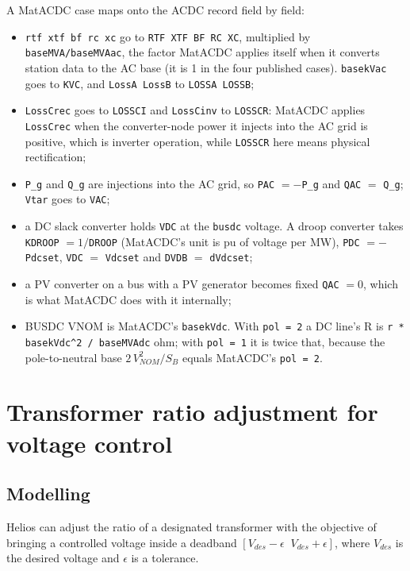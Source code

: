 A MatACDC case maps onto the ACDC record field by field:
\begin{itemize}
\item {\tt rtf xtf bf rc xc} go to {\tt RTF XTF BF RC XC}, multiplied by {\tt baseMVA/baseMVAac}, the factor MatACDC applies itself when it converts station data to the AC base (it is 1 in the four published cases). {\tt basekVac} goes to {\tt KVC}, and {\tt LossA LossB} to {\tt LOSSA LOSSB};
\item {\tt LossCrec} goes to {\tt LOSSCI} and {\tt LossCinv} to {\tt LOSSCR}: MatACDC applies {\tt LossCrec} when the converter-node power it injects into the AC grid is positive, which is inverter operation, while {\tt LOSSCR} here means physical rectification;
\item {\tt P\_g} and {\tt Q\_g} are injections into the AC grid, so {\tt PAC} $= -${\tt P\_g} and {\tt QAC} $=$ {\tt Q\_g}; {\tt Vtar} goes to {\tt VAC};
\item a DC slack converter holds {\tt VDC} at the {\tt busdc} voltage. A droop converter takes {\tt KDROOP} $= 1/${\tt DROOP} (MatACDC's unit is pu of voltage per MW), {\tt PDC} $= -${\tt Pdcset}, {\tt VDC} $=$ {\tt Vdcset} and {\tt DVDB} $=$ {\tt dVdcset};
\item a PV converter on a bus with a PV generator becomes fixed {\tt QAC} $= 0$, which is what MatACDC does with it internally;
\item BUSDC VNOM is MatACDC's {\tt basekVdc}. With {\tt pol = 2} a DC line's R is {\tt r * basekVdc\^{}2 / baseMVAdc} ohm; with {\tt pol = 1} it is twice that, because the pole-to-neutral base $2\,V_{NOM}^2/S_B$ equals MatACDC's {\tt pol = 2}.
\end{itemize}

\section{Transformer ratio adjustment for voltage control}\label{sec-pf-ltc}

\subsection{Modelling}

Helios can adjust the ratio of a designated transformer with the objective of bringing a controlled voltage inside a deadband $[V_{des}-\epsilon \;\; V_{des}+\epsilon]$, where $V_{des}$ is the desired voltage and $\epsilon$ is a tolerance.

